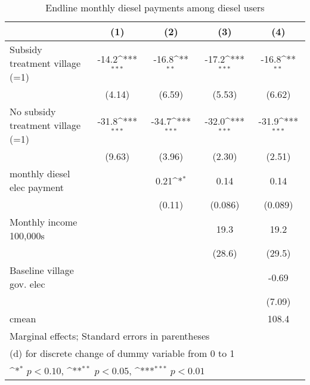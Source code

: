 \begin{table}[htbp]\centering
\def\sym#1{\ifmmode^{#1}\else\(^{#1}\)\fi}
\caption{Endline monthly diesel payments among diesel users}
\begin{tabular*}{1\hsize}{@{\hskip\tabcolsep\extracolsep\fill}l*{4}{c}}
\toprule
                &\multicolumn{1}{c}{(1)}         &\multicolumn{1}{c}{(2)}         &\multicolumn{1}{c}{(3)}         &\multicolumn{1}{c}{(4)}         \\
\midrule
Subsidy treatment village (=1)&    -14.2\sym{***}&    -16.8\sym{**} &    -17.2\sym{***}&    -16.8\sym{**} \\
                &   (4.14)         &   (6.59)         &   (5.53)         &   (6.62)         \\
No subsidy treatment village (=1)&    -31.8\sym{***}&    -34.7\sym{***}&    -32.0\sym{***}&    -31.9\sym{***}\\
                &   (9.63)         &   (3.96)         &   (2.30)         &   (2.51)         \\
monthly diesel elec payment&                  &     0.21\sym{*}  &     0.14         &     0.14         \\
                &                  &   (0.11)         &  (0.086)         &  (0.089)         \\
Monthly income 100,000s&                  &                  &     19.3         &     19.2         \\
                &                  &                  &   (28.6)         &   (29.5)         \\
Baseline village gov. elec&                  &                  &                  &    -0.69         \\
                &                  &                  &                  &   (7.09)         \\
\midrule
cmean           &                  &                  &                  &    108.4         \\
\bottomrule
\multicolumn{5}{l}{\footnotesize Marginal effects; Standard errors in parentheses}\\
\multicolumn{5}{l}{\footnotesize  (d) for discrete change of dummy variable from 0 to 1}\\
\multicolumn{5}{l}{\footnotesize \sym{*} \(p<0.10\), \sym{**} \(p<0.05\), \sym{***} \(p<0.01\)}\\
\end{tabular*}
\end{table}
